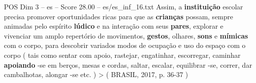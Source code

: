 \begin{textsample}{POS Dim 3 – es – Score 28.00 – es/es\_inf\_16.txt}
Assim, a \textbf{instituição} escolar precisa promover oportunidades ricas para que as \textbf{crianças} possam, sempre animadas pelo espírito \textbf{lúdico} e na interação com seus \textbf{pares}, explorar e vivenciar um amplo repertório de movimentos, \textbf{gestos}, olhares, \textbf{sons} e \textbf{mímicas} com o corpo, para descobrir variados modos de ocupação e uso do espaço com o corpo ( tais como sentar com apoio, rastejar, engatinhar, escorregar, caminhar \textbf{apoiando} -se em berços, mesas e cordas, saltar, escalar, equilibrar -se, correr, dar cambalhotas, alongar -se etc. ) > ( BRASIL, 2017, p. 36-37 )

\end{textsample}
